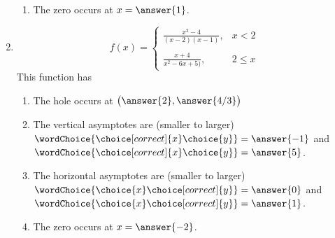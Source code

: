 \documentclass{ximera}
\begin{document}
\begin{exercise}
\begin{enumerate}
\begin{exercise}
\begin{enumerate}
\item The zero occurs at $x=\answer{1}$.
\end{enumerate}
\end{exercise}

\item \begin{equation*}
	f(x) = \begin{cases}
		\frac{x^2-4}{(x-2)(x-1)},  & x <2 \\
		\\
		\frac{x+4}{x^2-6x+5)},  & 2 \leq x 
		\end{cases}
		\end{equation*}
This function has
\begin{selectAll}
\end{selectAll}
%
\begin{exercise}
\begin{enumerate}
\item The hole occurs at $\big(\answer{2},\answer{4/3}\big)$

\item The vertical asymptotes are (smaller to larger) \\
$\wordChoice{\choice[correct]{x}\choice{y}} = \answer{-1}$ and $\wordChoice{\choice[correct]{x}\choice{y}} = \answer{5}$.

\item The horizontal asymptotes are (smaller to larger) \\
$\wordChoice{\choice{x}\choice[correct]{y}} = \answer{0}$ and $\wordChoice{\choice{x}\choice[correct]{y}} = \answer{1}$.

\item The zero occurs at $x=\answer{-2}$.
\end{enumerate}
\end{exercise}


\end{enumerate}
\end{exercise}
\end{document}
